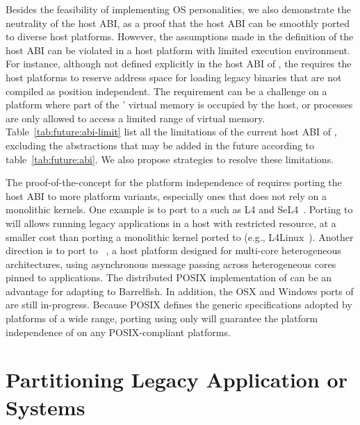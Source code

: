 Besides the feasibility of implementing OS personalities,
we also demonstrate the neutrality of the host ABI,
as a proof that the host ABI can be smoothly ported to diverse host platforms.
However, the assumptions made in the definition of the host ABI
can be violated in a host platform with limited execution environment.
For instance, although not defined explicitly in the host ABI of \graphene{},
the \picoprocs{} requires the host platforms
to reserve address space for loading legacy binaries that are not compiled as position independent.
The requirement can be a challenge on a platform
where part of the \picoprocs{}' virtual memory is occupied by the host,
or processes are only allowed to access a limited range of virtual memory.
Table~\ref{tab:future:abi-limit}
list all the limitations of the current host ABI of \graphene{},
excluding the abstractions that may be added in the future according to table~\ref{tab:future:abi}.
We also propose strategies to resolve these limitations.


The proof-of-the-concept for the platform independence of \graphene{}
requires porting the host ABI to more platform variants,
especially ones that does not rely on a monolithic kernels.
One example is to port \graphene{} to a \term{\microkernel{}}
such as L4 and SeL4~\citep{l4family, klein09sel4}.
Porting \picoprocs{} to \microkernel{} will allows running legacy applications
in a host with restricted resource,
at a smaller cost than porting a monolithic kernel ported to \microkernel{}
(e.g., L4Linux~\citep{hartig97mu}).
Another direction is to port \graphene{} to ~\citep{baumann09barrelfish},
a host platform designed for multi-core heterogeneous architectures,
using asynchronous message passing across heterogeneous cores pinned to applications.
The distributed POSIX implementation of \graphene{}
can be an advantage for adapting to Barrelfish.
In addition, the OSX and Windows ports of \graphene{} are still in-progress.
Because POSIX defines the generic specifications
adopted by platforms of a wide range,
porting \graphene{}
using only  will
guarantee the platform independence of \graphene{}
on any POSIX-compliant platforms.




\section{Partitioning Legacy Application or Systems}



